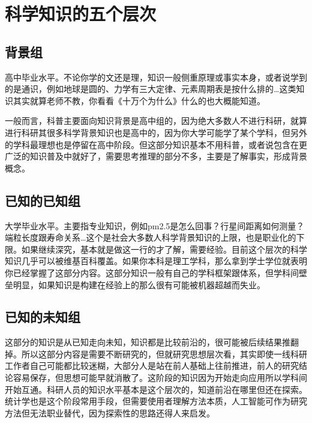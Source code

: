 \documentclass[]{tufte-book}
\begin{document}
\hypertarget{ux79d1ux5b66ux77e5ux8bc6ux7684ux4e94ux4e2aux5c42ux6b21}{%
\section{科学知识的五个层次}\label{ux79d1ux5b66ux77e5ux8bc6ux7684ux4e94ux4e2aux5c42ux6b21}}

\hypertarget{ux80ccux666fux7ec4}{%
\subsection{背景组}\label{ux80ccux666fux7ec4}}

高中毕业水平。不论你学的文还是理，知识一般侧重原理或事实本身，或者说学到的是通识，例如地球是圆的、力学有三大定律、元素周期表是按什么排的\ldots 这类知识其实就算老师不教，你看看《十万个为什么》什么的也大概能知道。

一般而言，科普主要面向知识背景是高中组的，因为绝大多数人不进行科研，就算进行科研其很多科学背景知识也是高中的，因为你大学可能学了某个学科，但另外的学科最理想也是停留在高中阶段。但这部分知识基本不用科普，或者说包含在更广泛的知识普及中就好了，需要思考推理的部分不多，主要是了解事实，形成背景概念。

\hypertarget{ux5df2ux77e5ux7684ux5df2ux77e5ux7ec4}{%
\subsection{已知的已知组}\label{ux5df2ux77e5ux7684ux5df2ux77e5ux7ec4}}

大学毕业水平。主要指专业知识，例如pm2.5是怎么回事？行星间距离如何测量？端粒长度跟寿命关系\ldots 这个是社会大多数人科学背景知识的上限，也是职业化的下限。如果继续深究，基本就是做这一行的才了解，需要经验。目前这个层次的科学知识几乎可以被维基百科覆盖。如果你本科是理工学科，那么拿到学士学位就表明你已经掌握了这部分内容。这部分知识一般有自己的学科框架跟体系，但学科间壁垒明显，如果知识是构建在经验上的那么很有可能被机器超越而失业。

\hypertarget{ux5df2ux77e5ux7684ux672aux77e5ux7ec4}{%
\subsection{已知的未知组}\label{ux5df2ux77e5ux7684ux672aux77e5ux7ec4}}

这部分的知识是从已知走向未知，知识都是比较前沿的，很可能被后续结果推翻掉。所以这部分内容是需要不断研究的，但就研究思想层次看，其实即使一线科研工作者自己可能都比较迷糊，大部分人是站在前人基础上往前推进，前人的研究结论容易保存，但思想可能早就消散了。这阶段的知识因为开始走向应用所以学科间开始互通。科研人员的知识水平基本是这个层次的，知道前沿在哪里但还在探索。统计学也是这个阶段常用手段，但需要使用者理解方法本质，人工智能可作为研究方法但无法职业替代，因为探索性的思路还得人来启发。
\end{document}
